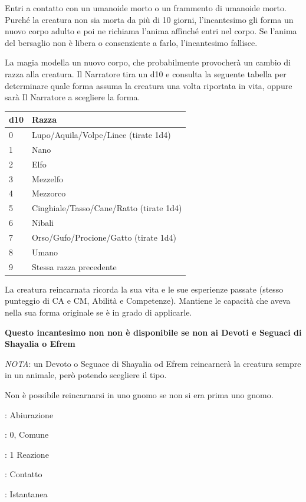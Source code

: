 \begin{multicols}{2}
Entri a contatto con un umanoide morto o un frammento di umanoide morto. Purché la creatura non sia morta da più di 10 giorni, l'incantesimo gli forma un nuovo corpo adulto e poi ne richiama l'anima affinché entri nel corpo. Se l'anima del bersaglio non è libera o consenziente a farlo, l'incantesimo fallisce.

La magia modella un nuovo corpo, che probabilmente provocherà un cambio di razza alla creatura. Il Narratore tira un d10 e consulta la seguente tabella per determinare quale forma assuma la creatura una volta riportata in vita, oppure sarà Il Narratore a scegliere la forma.

\medskip

\noindent\begin{tabular}{ll}
	\toprule
 \rowcolor{gray!20}\textbf{d10} &\textbf{Razza}\\
	\toprule
	0 & Lupo/Aquila/Volpe/Lince (tirate 1d4)\\
 \rowcolor{gray!20}1&Nano\\
	2&Elfo\\
 \rowcolor{gray!20}3&Mezzelfo\\
	4&Mezzorco\\
 \rowcolor{gray!20}5&Cinghiale/Tasso/Cane/Ratto (tirate 1d4)\\
	6&Nibali\\
 \rowcolor{gray!20}7&Orso/Gufo/Procione/Gatto (tirate 1d4)\\
	8&Umano\\
 \rowcolor{gray!20}9&Stessa razza precedente
\end{tabular}

\medskip

La creatura reincarnata ricorda la sua vita e le sue esperienze passate (stesso punteggio di CA e CM, Abilità e Competenze). Mantiene le capacità che aveva nella sua forma originale se è in grado di applicarle.

\textbf{Questo incantesimo non non è disponibile se non ai Devoti e Seguaci di Shayalia o Efrem}

\emph{NOTA}: un Devoto o Seguace di Shayalia od Efrem reincarnerà la creatura sempre in un animale, però potendo scegliere il tipo.

Non è possibile reincarnarsi in uno gnomo se non si era prima uno gnomo.

\noindent\colorbox{OBSSgold!10}{
\begin{minipage}{0.95\linewidth}
\begin{description}[noitemsep, topsep=0pt, parsep=0pt, partopsep=0pt, leftmargin=0cm, labelwidth=1.3cm]
	\item[\textbf{Lista}]: Abiurazione
	\item[\textbf{Livello}]: 0, Comune
	\item[\textbf{Lancio}]: 1 Reazione
	\item[\textbf{Gittata}]: Contatto
	\item[\textbf{Durata}]: Istantanea
\end{description}
\end{minipage}}\smallskip


\end{multicols}
